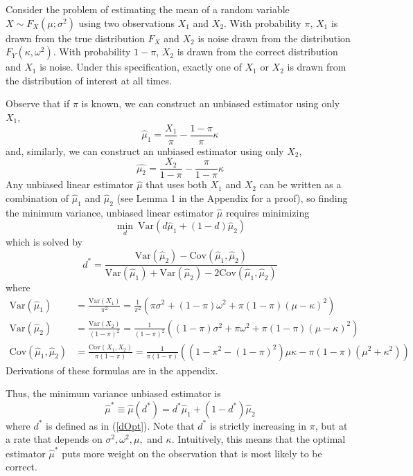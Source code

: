 \documentclass[12pt]{article}
\newcommand{\Var}[1]{\text{Var}\left(#1\right)}
\begin{document}
Consider the problem of estimating the mean of a random variable $X \sim F_X(\mu; \sigma^2)$ using two observations $X_{1}$ and $X_{2}$.  With probability $\pi$, $X_1$ is drawn from the true distribution $F_X$ and $X_2$ is noise drawn from the distribution $F_Y(\kappa, \omega^2)$.  With probability $1-\pi$, $X_2$ is drawn from the correct distribution and $X_1$ is noise.  Under this specification, exactly one of $X_1$ or $X_2$ is drawn from the distribution of interest at all times.  

Observe that if $\pi$ is known, we can construct an unbiased estimator using only $X_1$,
\begin{equation}
\hat{\mu}_1 = \frac{X_1}{\pi} - \frac{1-\pi}{\pi} \kappa 
\label{mu1}
\end{equation} 
and, similarly, we can construct an unbiased estimator using only $X_2$,
\begin{equation}\hat{\mu_2} = \frac{X_2}{1-\pi} - \frac{\pi}{1-\pi} \kappa \label{mu2} \end{equation} 
Any unbiased linear estimator $\hat{\mu}$ that uses both $X_1$ and $X_2$ can be written as a combination of $\hat{\mu}_1$ and $\hat{\mu}_2$ (see Lemma 1 in the Appendix for a proof), so finding the minimum variance, unbiased linear estimator $\hat{\mu}$ requires minimizing 
$$\min_d\  \Var{d \hat{\mu}_1 + (1-d) \hat{\mu}_2}$$
which is solved by \begin{equation} d^*= \frac{\Var{\hat{\mu}_2} - \text{Cov}(\hat{\mu}_1, \hat{\mu}_2)}{\Var{\hat{\mu}_1} + \Var{\hat{\mu}_2} - 2 \text{Cov}(\hat{\mu}_1, \hat{\mu}_2)} \label{dOpt}\end{equation}
where
\begin{align} \Var{\hat{\mu}_1} &=  \frac{\text{Var}(X_1)}{\pi^2} = \frac{1}{\pi^2}\left(\pi \sigma^2 + (1-\pi) \omega^2 + \pi(1-\pi)(\mu-\kappa)^2\right) \label{vmu1}\\
\Var{\hat{\mu}_2} &= \frac{\Var{X_2}}{(1-\pi)^2} = \frac{1}{(1-\pi)^2}\left((1-\pi)\sigma^2 + \pi \omega^2 + \pi(1-\pi)(\mu-\kappa)^2\right)\label{vmu2} \\
\text{Cov}(\hat{\mu}_1, \hat{\mu}_2) &= \frac{\text{Cov}(X_1,X_2)}{\pi(1-\pi)} = \frac{1}{\pi(1-\pi)}\left((1-\pi^2 - (1-\pi)^2)\mu\kappa - \pi(1-\pi)(\mu^2 + \kappa^2)\right) \label{cov}
\end{align} 
Derivations of these formulas are in the appendix.

Thus, the minimum variance unbiased estimator is 
\begin{equation} \hat{\mu}^* \equiv \hat{\mu}(d^*) = d^* \hat{\mu}_1 + (1-d^*) \hat{\mu}_2 \label{muOpt}
\end{equation}
where $d^*$ is defined as in (\ref{dOpt}).  Note that $d^*$ is strictly increasing in $\pi$, but at a rate that depends on $\sigma^2, \omega^2, \mu,$ and $\kappa$.  Intuitively, this means that the optimal estimator $\hat{\mu}^*$ puts more weight on the observation that is most likely to be correct. 
\end{document}
